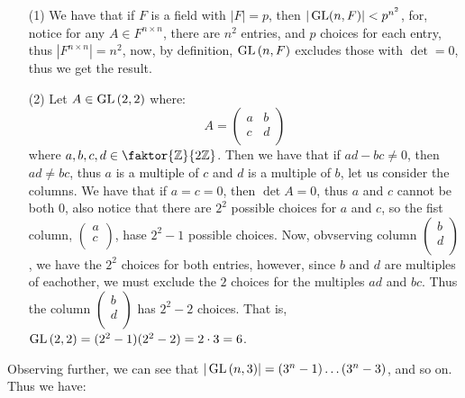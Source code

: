 \begin{example}
  \begin{enumerate}
    \item[(1)] We have that if $F$ is a field with  $|F|=p$, then
      $|\operatorname{GL}(n,F)|<p^{n^2}$, for, notice for any $A \in F^{n \times n}$,
      there are $n^2$ entries, and  $p$ choices for each entry, thus
      $|F^{n \times n}|=n^2$, now, by definition, $\operatorname{GL}{(n,F)}$ excludes
      those with $\det=0$, thus we get the result.

    \item[(2)] Let $A \in \operatorname{GL}{(2,2)}$ where:
      \begin{equation*}
        A=\begin{pmatrix}
          a   &   b   \\
          c   &   d   \\
        \end{pmatrix}
      \end{equation*}
      where $a,b,c,d \in \faktor{\Z}{2\Z}$. Then we have that if $ad-bc
      \neq 0$, then  $ad \neq bc$, thus $a$ is a multiple of  $c$ and  $d$
      is a multiple of  $b$, let us consider the columns. We have that if
      $a=c=0$, then  $\det{A}=0$, thus $a$ and  $c$ cannot be both  $0$,
      also notice that there are $2^2$ possible choices for  $a$
      and  $c$, so the fist column, $\begin{pmatrix}a \\ c
      \\\end{pmatrix}$, hase $2^2-1$ possible choices. Now, obvserving
      column $\begin{pmatrix}b \\ d \\\end{pmatrix}$, we have the $2^2$
      choices for both entries, however, since  $b$ and  $d$ are
      multiples of eachother, we must exclude the $2$ choices for the
      multiples $ad$ and  $bc$. Thus the column $\begin{pmatrix}b \\ d
      \\\end{pmatrix}$ has $2^2-2$ choices. That is,
      $\operatorname{GL}{(2,2)}=(2^2-1)(2^2-2)=2 \cdot 3=6$.
  \end{enumerate}
\end{example}

Observing further, we can see that $|\operatorname{GL}{(n,3)}|=(3^n-1) \dots (3^n-3)$, and so
on. Thus we have:

